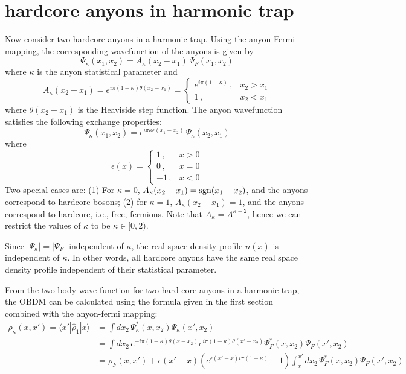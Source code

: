 \documentclass[onecolumn,english,aps,pra]{revtex4}
\begin{document}
\section{hardcore anyons in harmonic trap}
Now consider two hardcore anyons in a harmonic trap. Using the anyon-Fermi mapping, the corresponding wavefunction of the anyons is given by 
\[ \Psi_\kappa (x_1,x_2) = A_\kappa(x_2-x_1) \,\Psi_F(x_1,x_2) \]
where $\kappa$ is the anyon statistical parameter and 
\[ A_\kappa (x_2-x_1) = e^{i\pi (1-\kappa) \theta(x_2-x_1)}= \left\{ \begin{array}{ll} e^{i\pi(1-\kappa)}\,, & x_2>x_1 \\ 1 \,, & x_2 <x_1 \end{array}  \right.  \] where $\theta(x_2-x_1)$ is the Heaviside step function.
The anyon wavefunction satisfies the following exchange properties:
\[ \Psi_\kappa(x_1,x_2) = e^{i\pi \kappa \epsilon(x_1-x_2)} \,\Psi_\kappa(x_2,x_1) \]
where \[ \epsilon(x) =  \left\{  \begin{array}{cl} 1\,, & x>0 \\ 0 \,, & x=0 \\ -1\,, & x<0 \end{array} \right.\]
Two special cases are: (1) For $\kappa=0$, $ A_\kappa (x_2-x_1) = {\rm sgn}(x_1-x_2)$, and the anyons correspond to hardcore bosons; (2) for $\kappa=1$, $A_\kappa (x_2-x_1) = 1$, and the anyons correspond to hardcore, i.e., free, fermions. Note that $A_\kappa = A^{\kappa+2}$, hence we can restrict the values of $\kappa$ to be $\kappa \in [0, 2)$. 

Since $|\Psi_\kappa| = |\Psi_F|$ independent of $\kappa$, the real space density profile $n(x)$ is independent of $\kappa$. In other words, all hardcore anyons have the same real space density profile independent of their statistical parameter.

From the two-body wave function for two hard-core anyons in a harmonic trap, the OBDM can be calculated using the formula given in the first section combined with the anyon-fermi mapping:
\begin{align*}
\rho_\kappa(x,x')= \langle x'|\hat{\rho}_1| x \rangle &= \int dx_2 \, \Psi_{\kappa}^*(x,x_2) \Psi_\kappa(x',x_2)\\
& = \int dx_2 \,  e^{-i\pi (1-\kappa) \theta(x - x_2)} e^{i\pi (1-\kappa) \theta(x' - x_2)} \Psi_{F}^*(x,x_2) \Psi_{F}(x',x_2)\\
& = \rho_{F}(x,x') + \epsilon(x' - x)(e^{\epsilon(x' - x) i\pi (1-\kappa)} - 1)\int_{x}^{x'} dx_2 \, \Psi_{F}^*(x,x_2) \Psi_{F}(x',x_2)
\end{align*}
\end{document}
